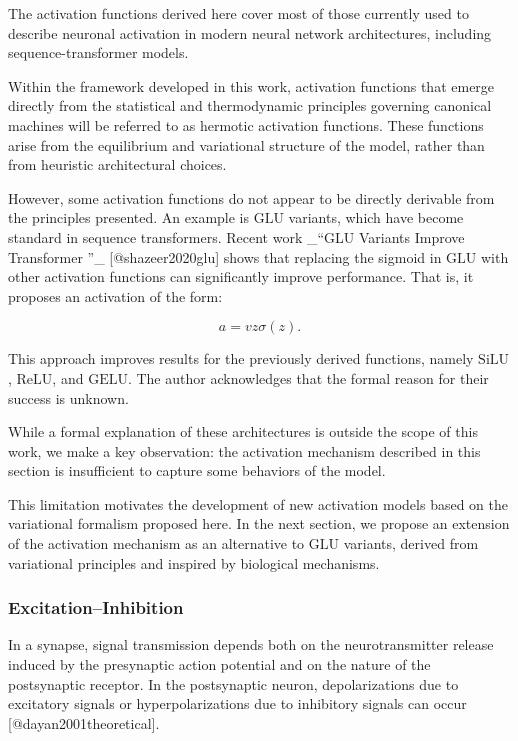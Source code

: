 \documentclass[12pt]{article}
\begin{document}
The activation functions derived here cover most of those currently used to describe neuronal activation in modern neural network architectures, including sequence-transformer models.

Within the framework developed in this work, activation functions that emerge directly from the statistical and thermodynamic principles governing canonical machines will be referred to as hermotic activation functions. These functions arise from the equilibrium and variational structure of the model, rather than from heuristic architectural choices.

However, some activation functions do not appear to be directly derivable from the principles presented. An example is $\text{GLU}$ variants, which have become standard in sequence transformers. Recent work _“GLU Variants Improve Transformer ”_ [@shazeer2020glu] shows that replacing the sigmoid in $\text{GLU}$ with other activation functions can significantly improve performance. That is, it proposes an activation of the form:

\begin{equation}
a = v z \sigma(z) .
\end{equation}

This approach improves results for the previously derived functions, namely $\text{SiLU}$, $\text{ReLU}$, and $\text{GELU}$. The author acknowledges that the formal reason for their success is unknown.

While a formal explanation of these architectures is outside the scope of this work, we make a key observation: the activation mechanism described in this section is insufficient to capture some behaviors of the model.

This limitation motivates the development of new activation models based on the variational formalism proposed here. In the next section, we propose an extension of the activation mechanism as an alternative to $\text{GLU}$ variants, derived from variational principles and inspired by biological mechanisms.

\subsubsection{Excitation–Inhibition}

In a synapse, signal transmission depends both on the neurotransmitter release induced by the presynaptic action potential and on the nature of the postsynaptic receptor. In the postsynaptic neuron, depolarizations due to excitatory signals or hyperpolarizations due to inhibitory signals can occur [@dayan2001theoretical].
\end{document}
